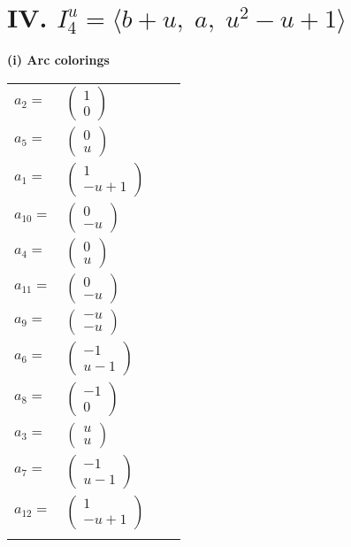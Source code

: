\documentclass[1p]{elsarticle_modified}
\theoremstyle{definition}
\begin{document}
\centering \section*{IV. $I^u_{4}= \langle b+u,\;a,\;u^2- u+1 \rangle$}
\flushleft \textbf{(i) Arc colorings}\\
\begin{tabular}{m{7pt} m{180pt} m{7pt} m{180pt} }
\flushright $a_{2}=$&$\begin{pmatrix}1\\0\end{pmatrix}$ \\
\flushright $a_{5}=$&$\begin{pmatrix}0\\u\end{pmatrix}$ \\
\flushright $a_{1}=$&$\begin{pmatrix}1\\- u+1\end{pmatrix}$ \\
\flushright $a_{10}=$&$\begin{pmatrix}0\\- u\end{pmatrix}$ \\
\flushright $a_{4}=$&$\begin{pmatrix}0\\u\end{pmatrix}$ \\
\flushright $a_{11}=$&$\begin{pmatrix}0\\- u\end{pmatrix}$ \\
\flushright $a_{9}=$&$\begin{pmatrix}- u\\- u\end{pmatrix}$ \\
\flushright $a_{6}=$&$\begin{pmatrix}-1\\u-1\end{pmatrix}$ \\
\flushright $a_{8}=$&$\begin{pmatrix}-1\\0\end{pmatrix}$ \\
\flushright $a_{3}=$&$\begin{pmatrix}u\\u\end{pmatrix}$ \\
\flushright $a_{7}=$&$\begin{pmatrix}-1\\u-1\end{pmatrix}$ \\
\flushright $a_{12}=$&$\begin{pmatrix}1\\- u+1\end{pmatrix}$\\&\end{tabular}
\end{document}
